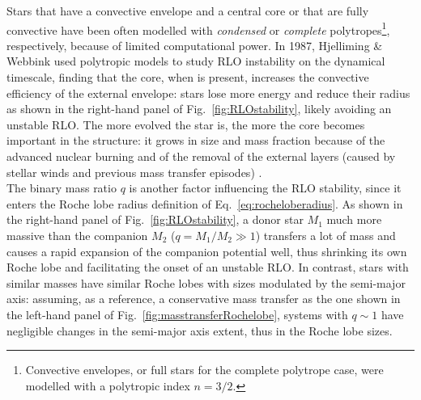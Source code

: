 \documentclass[a4paper,titlepage]{book}     	%
\begin{document}
Stars that have a convective envelope and a central core or that are fully convective have been often modelled with  \emph{condensed} or \emph{complete} polytropes\footnote{Convective envelopes, or full stars for the complete polytrope case, were modelled with a polytropic index $n=3/2$.}, respectively, because of limited computational power. In 1987, Hjelliming \& Webbink used polytropic models to study RLO instability on the dynamical timescale, finding that the core, when is present, increases the convective efficiency of the external envelope: stars lose more energy and reduce their radius as shown in the right-hand panel of Fig.\ \ref{fig:RLOstability}, likely avoiding an unstable RLO. The more evolved the star is, the more the core becomes important in the structure: it grows in size and mass fraction because of the advanced nuclear burning and of the removal of the external layers (caused by stellar winds and previous mass transfer episodes) \cite{hjellmingwebbink1987_coreRLOF} .\\

The binary mass ratio $q$ is another factor influencing the RLO stability, since it enters the Roche lobe radius definition of Eq.\ \ref{eq:rocheloberadius}. As shown in the right-hand panel of Fig.\ \ref{fig:RLOstability}, a donor star $M_1$ much more massive than the companion $M_2$ ($q=M_1/M_2 \gg 1$) transfers a lot of mass and causes a rapid expansion of the companion potential well, thus shrinking its own Roche lobe and facilitating the onset of an unstable RLO. In contrast, stars with similar masses have similar Roche lobes with sizes modulated by the semi-major axis: assuming, as a reference, a conservative mass transfer as the one shown in the left-hand panel of Fig.\ \ref{fig:masstransferRochelobe}, systems with $q \sim 1$ have negligible changes in the semi-major axis extent, thus in the Roche lobe sizes. \\
\end{document}
